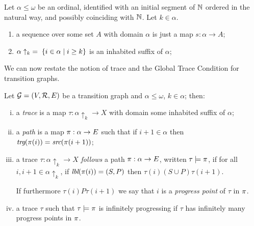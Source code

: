 
\begin{definition}
Let $\alpha \leq \omega$ be an ordinal, 
identified with an initial segment of $\mathbb{N}$ 
ordered in the natural way, and possibly coinciding with $\mathbb{N}$. Let $k \in \alpha$.
\begin{enumerate}
\item
a sequence over some set $A$ with domain $\alpha$ is just a map $s:\alpha \to A$;  

\item
$\alpha\uparrow_k \;=\; \{ i \in \alpha \mid i \geq k \}$ is an inhabited suffix of $\alpha$; 

\end{enumerate}
\end{definition}

We can now restate the notion of trace and the Global Trace Condition for transition graphs.

\begin{definition}\label{def:TracePath}
Let $\mathcal{G} = (V, \mathcal{R}, E)$ be a transition graph and $\alpha \leq \omega$, $k \in \alpha$; 
then:
\begin{enumerate}[i)]
\item 
a {\em trace} is a map $\tau:\alpha\uparrow_k \to X$ with domain some inhabited 
suffix of $\alpha$;

\item 
a {\em path} is a map $\pi:\alpha \to E$ such that if $i + 1 \in \alpha$ then 
$\textit{trg}( \pi(i) ) = \textit{src}( \pi(i+1) )$;

\item 
a trace $\tau:\alpha\uparrow_k \to X$ {\em follows} a path $\pi: \alpha \to E$,
written $\tau \models \pi$, if for all $i,i+1 \in \alpha\uparrow_k$,
if $\textit{lbl}( \pi(i) ) = (S,P)$ then $\tau(i) (S \cup P) \tau(i + 1)$.

If furthermore $\tau(i) P \tau(i + 1)$ 
we say that $i$ is a {\em progress point} of $\tau$ in $\pi$.

\item 
a trace $\tau$ such that $\tau\models \pi$ 
is infinitely progressing if $\tau$ has infinitely many progress points in $\pi$.
\end{enumerate}
\end{definition}


